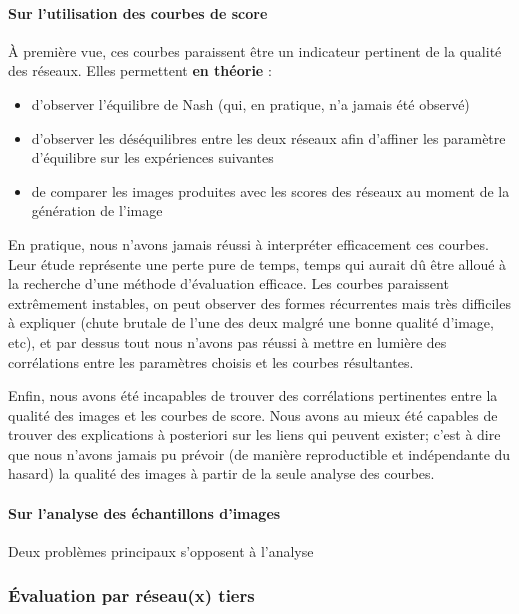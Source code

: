 \paragraph{Sur l'utilisation des courbes de score}

À première vue, ces courbes paraissent être un indicateur pertinent de la qualité des réseaux. Elles permettent \textbf{en théorie} :
\begin{itemize}
  \item d'observer l'équilibre de Nash (qui, en pratique, n'a jamais été observé)
  \item d'observer les déséquilibres entre les deux réseaux afin d'affiner les paramètre d'équilibre sur les expériences suivantes
  \item de comparer les images produites avec les scores des réseaux au moment de la génération de l'image
\end{itemize}

En pratique, nous n'avons jamais réussi à interpréter efficacement ces courbes. Leur étude représente une perte pure de temps, temps qui aurait dû être alloué à la recherche d'une méthode d'évaluation efficace. Les courbes paraissent extrêmement instables, on peut observer des formes récurrentes mais très difficiles à expliquer (chute brutale de l'une des deux malgré une bonne qualité d'image, etc), et par dessus tout nous n'avons pas réussi à mettre en lumière des corrélations entre les paramètres choisis et les courbes résultantes.

Enfin, nous avons été incapables de trouver des corrélations pertinentes entre la qualité des images et les courbes de score. Nous avons au mieux été capables de trouver des explications à posteriori sur les liens qui peuvent exister; c'est à dire que nous n'avons jamais pu prévoir (de manière reproductible et indépendante du hasard) la qualité des images à partir de la seule analyse des courbes.

\paragraph{Sur l'analyse des échantillons d'images}

Deux problèmes principaux s'opposent à l'analyse 

\subsubsection{Évaluation par réseau(x) tiers}

